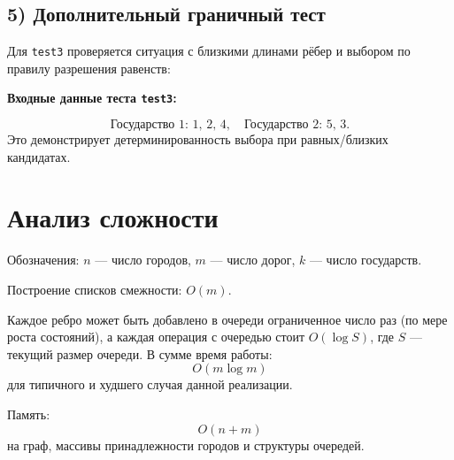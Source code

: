 \documentclass[12pt,a4paper]{article}
\begin{document}
\subsection*{5) Дополнительный граничный тест}
Для \texttt{test3} проверяется ситуация с близкими длинами рёбер и выбором по правилу разрешения равенств:

\textbf{Входные данные теста \texttt{test3}:}

{\small
{}
}

\[
\text{Государство 1: }1,\,2,\,4,\quad
\text{Государство 2: }5,\,3.
\]
Это демонстрирует детерминированность выбора при равных/близких кандидатах.

\section{Анализ сложности}
Обозначения: $n$ --- число городов, $m$ --- число дорог, $k$ --- число государств.

Построение списков смежности: $O(m)$.

Каждое ребро может быть добавлено в очереди ограниченное число раз (по мере роста состояний), а каждая операция с очередью стоит $O(\log S)$, где $S$ --- текущий размер очереди. В сумме время работы:
\[
O(m \log m)
\]
для типичного и худшего случая данной реализации.

Память:
\[
O(n + m)
\]
на граф, массивы принадлежности городов и структуры очередей.
\end{document}
